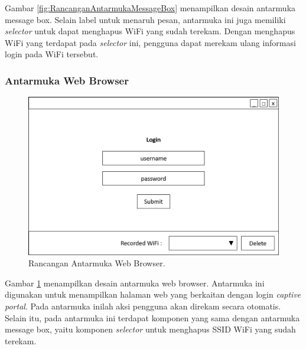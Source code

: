 Gambar \ref{fig:RancanganAntarmukaMessageBox} menampilkan desain antarmuka message box. Selain label untuk menaruh pesan, antarmuka ini juga memiliki \textit{selector} untuk dapat menghapus WiFi yang sudah terekam. Dengan menghapus WiFi yang terdapat pada \textit{selector} ini, pengguna dapat merekam ulang informasi login pada WiFi tersebut.

\subsubsection{Antarmuka Web Browser}
\label{subsec:antarmuka_web_browser}

\begin{figure}[!htb]
    \centering
    \includegraphics[scale=0.5]{Gambar/UI_WebBrowser.png}
    \caption[Rancangan Antarmuka Web Browser.]{Rancangan Antarmuka Web Browser.}
    \label{fig:RancanganAntarmukaWebBrowser}
\end{figure}

Gambar \ref{fig:RancanganAntarmukaWebBrowser} menampilkan desain antarmuka web browser. Antarmuka ini digunakan untuk menampilkan halaman web yang berkaitan dengan login \textit{captive portal}. Pada antarmuka inilah aksi pengguna akan direkam secara otomatis. Selain itu, pada antarmuka ini terdapat komponen yang sama dengan antarmuka message box, yaitu komponen \textit{selector} untuk menghapus SSID WiFi yang sudah terekam.